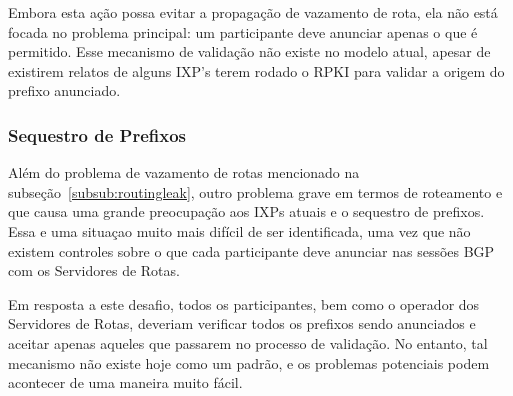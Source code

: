 \documentclass[12pt]{article}
\begin{document}

Embora esta ação possa evitar a propagação de vazamento de rota, ela não está focada no problema principal: um participante deve anunciar apenas o que é permitido. Esse mecanismo de validação não existe no modelo atual, apesar de existirem relatos de alguns IXP's terem rodado o RPKI para validar a origem do prefixo anunciado.


\subsubsection{Sequestro de Prefixos}
Além do problema de vazamento de rotas mencionado na subseção~\ref{subsub:routingleak}, outro problema grave em termos de roteamento e que causa uma grande preocupação aos IXPs atuais e o sequestro de prefixos. Essa e uma situaçao muito mais difícil de ser identificada, uma vez que não existem controles sobre o que cada participante deve anunciar nas sessões BGP com os Servidores de Rotas. 

Em resposta a este desafio, todos os participantes, bem como o operador dos Servidores de Rotas, deveriam verificar todos os prefixos sendo anunciados e aceitar apenas aqueles que passarem no processo de validação. No entanto, tal mecanismo não existe hoje como um padrão, e os problemas potenciais podem acontecer de uma maneira muito fácil.

\end{document}
